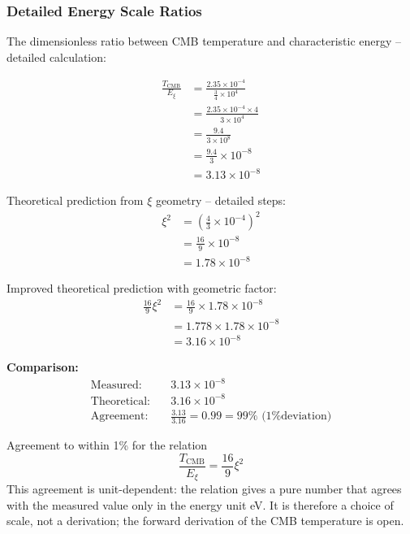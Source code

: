 	\subsubsection{Detailed Energy Scale Ratios}
	
	The dimensionless ratio between CMB temperature and characteristic energy -- detailed calculation:
	
	\begin{align}
		\frac{T_{\text{CMB}}}{E_\xi} &= \frac{2.35 \times 10^{-4}}{\frac{3}{4} \times 10^4} \\
		&= \frac{2.35 \times 10^{-4} \times 4}{3 \times 10^4} \\
		&= \frac{9.4}{3 \times 10^8} \\
		&= \frac{9.4}{3} \times 10^{-8} \\
		&= 3.13 \times 10^{-8}
	\end{align}
	
	Theoretical prediction from $\xi$ geometry -- detailed steps:
	\begin{align}
		\xi^2 &= \left(\frac{4}{3} \times 10^{-4}\right)^2 \\
		&= \frac{16}{9} \times 10^{-8} \\
		&= 1.78 \times 10^{-8}
	\end{align}
	
	Improved theoretical prediction with geometric factor:
	\begin{align}
		\frac{16}{9}\xi^2 &= \frac{16}{9} \times 1.78 \times 10^{-8} \\
		&= 1.778 \times 1.78 \times 10^{-8} \\
		&= 3.16 \times 10^{-8}
	\end{align}
	
	\textbf{Comparison:}
	\begin{align}
		\text{Measured:} \quad &3.13 \times 10^{-8} \\
		\text{Theoretical:} \quad &3.16 \times 10^{-8} \\
		\text{Agreement:} \quad &\frac{3.13}{3.16} = 0.99 = 99\% \text{ (1\% deviation)}
	\end{align}
	
	Agreement to within 1\% for the relation
	\begin{equation}
		\boxed{\frac{T_{\text{CMB}}}{E_\xi} = \frac{16}{9}\xi^2}
	\end{equation}
	This agreement is unit-dependent: the relation gives a pure number that agrees with the measured value only in the energy unit eV. It is therefore a choice of scale, not a derivation; the forward derivation of the CMB temperature is open.
	
